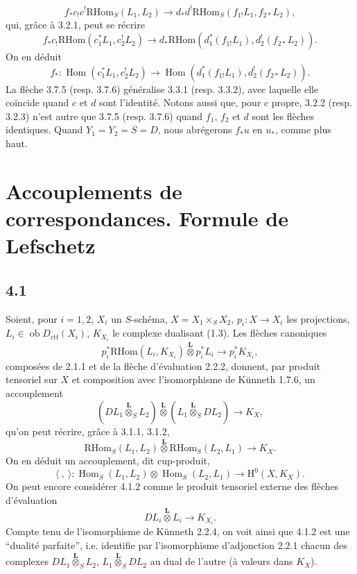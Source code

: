 \documentclass[11pt]{article}
\renewcommand{\H}{\mathrm{H}}
\DeclareMathOperator{\Hom}{Hom}
\newcommand{\ob}{\operatorname{ob}}
\providecommand{\RHom}{\mathrm{RHom}}
\providecommand{\Dctf}{D_{\mathrm{ctf}}}
\providecommand{\Dctf}{D_{\mathrm{ctf}}}
\providecommand{\RHom}{\mathrm{RHom}}
\providecommand{\Hom}{\operatorname{Hom}}
\providecommand{\ob}{\operatorname{ob}}
\providecommand{\RHom}{\mathrm R\mathcal{H}om}
\providecommand{\RHom}{\mathrm{RHom}}
\providecommand{\Hom}{\operatorname{Hom}}
\begin{document}
\begin{equation}
f_*c_!c^!\RHom_S(L_1,L_2)
\longrightarrow
 d_*d^!\RHom_S(f_{1!}L_1,f_{2*}L_2),
\tag{3.7.4}
\end{equation}
qui, grâce à 3.2.1, peut se récrire
\begin{equation}
f_*c_!\RHom(c_1^*L_1,c_2^!L_2)
\longrightarrow
 d_*\RHom(d_1^*(f_{1!}L_1),d_2^!(f_{2*}L_2)).
\tag{3.7.5}
\end{equation}
On en déduit
\begin{equation}
f_*:\Hom(c_1^*L_1,c_2^!L_2)
\longrightarrow
\Hom(d_1^*(f_{1!}L_1),d_2^!(f_{2*}L_2)).
\tag{3.7.6}
\end{equation}
La flèche 3.7.5 (resp. 3.7.6) généralise 3.3.1 (resp. 3.3.2), avec laquelle elle coïncide quand $c$ et $d$ sont l'identité. Notons aussi que, pour $c$ propre, 3.2.2 (resp. 3.2.3) n'est autre que 3.7.5 (resp. 3.7.6) quand $f_1$, $f_2$ et $d$ sont les flèches identiques. Quand $Y_1=Y_2=S=D$, nous abrégerons $f_*u$ en $u_*$, comme plus haut.

\section{Accouplements de correspondances. Formule de Lefschetz}

\subsection*{4.1}
Soient, pour $i=1,2$, $X_i$ un $S$-schéma, $X=X_1\times_SX_2$, $p_i:X\to X_i$ les projections, $L_i\in\ob\Dctf(X_i)$, $K_{X_i}$ le complexe dualisant (1.3). Les flèches canoniques
\begin{equation}
p_i^*\RHom(L_i,K_{X_i})\overset{\mathbf L}{\otimes}p_i^*L_i
\longrightarrow p_i^*K_{X_i},
\tag{4.1.1}
\end{equation}
composées de 2.1.1 et de la flèche d'évaluation 2.2.2, donnent, par produit tensoriel sur $X$ et composition avec l'isomorphisme de Künneth 1.7.6, un accouplement
\begin{equation}
(DL_1\overset{\mathbf L}{\otimes}_S L_2)\overset{\mathbf L}{\otimes}(L_1\overset{\mathbf L}{\otimes}_S DL_2)
\longrightarrow K_X,
\tag{4.1.2}
\end{equation}
qu'on peut récrire, grâce à 3.1.1, 3.1.2,
\begin{equation}
\RHom_S(L_1,L_2)\overset{\mathbf L}{\otimes}\RHom_S(L_2,L_1)
\longrightarrow K_X.
\tag{4.1.3}
\end{equation}
On en déduit un accouplement, dit cup-produit,
\begin{equation}
\langle\ ,\ \rangle:\Hom_S(L_1,L_2)\otimes\Hom_S(L_2,L_1)
\longrightarrow \H^0(X,K_X).
\tag{4.1.4}
\end{equation}
On peut encore considérer 4.1.2 comme le produit tensoriel externe des flèches d'évaluation
\[
DL_i\overset{\mathbf L}{\otimes}L_i\longrightarrow K_{X_i}.
\]
Compte tenu de l'isomorphisme de Künneth 2.2.4, on voit ainsi que 4.1.2 est une ``dualité parfaite'', i.e. identifie par l'isomorphisme d'adjonction 2.2.1 chacun des complexes $DL_1\overset{\mathbf L}{\otimes}_S L_2$, $L_1\overset{\mathbf L}{\otimes}_S DL_2$ au dual de l'autre (à valeurs dans $K_X$).
\end{document}
